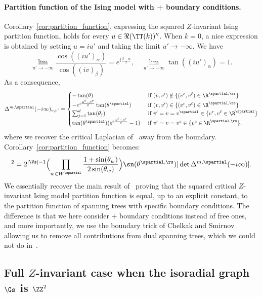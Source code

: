 \documentclass[a4paper,twoside,11pt]{article}
\begin{document}
\paragraph{Partition function of the Ising model with + boundary conditions.} Corollary~\ref{cor:partition_function}, 
expressing the squared $Z$-invariant
Ising partition function, holds for every $u\in\Re(\TT(k))''$. 
When $k=0$, a nice expression is obtained by setting $u=iu'$ and taking the limit $u'\rightarrow-\infty$. We have 
\[
\lim_{u'\rightarrow-\infty} \frac{\cos((iu')_\alpha)}{\cos((iv)_\beta)}=e^{i\frac{\beta-\alpha}{2}}, \quad 
\lim_{u'\rightarrow-\infty} \tan((iu')_{\alpha})=1.
\]
As a consequence, 
\begin{equation*}
\Delta^{m,\spartial}(-i\infty)_{v,v'}=
\begin{cases}
-\tan(\theta)& \text{  if $(v,v')\notin\{(v^c,v^\ell)\in \R^{\spartial,\rs}\}$}\\
-e^{i\frac{\alpha^\ell-\beta^r}{2}}\tan(\theta^\spartial)&\text{ if $(v,v')\in\{(v^c,v^\ell)\in \R^{\spartial,\rs}\}$}\\
\sum_{j=1}^d \tan(\theta_j)&\text{ if $v'=v=v^\spartial\in\{v^r,v^\ell\in\R^\spartial\}$}\\
\tan(\theta^\spartial)(e^{i\frac{\alpha^\ell-\beta^r}{2}}-1)&\text{ if $v'=v=v^c\in\{v^c\in \R^{\spartial,\rs}\}$},
\end{cases}
\end{equation*}
where we recover the critical Laplacian of~\cite{Kenyon3} away from the boundary. Corollary~\ref{cor:partition_function} becomes:
\begin{equation*}
[\Zising^+(\Gs,\Js)]^2=2^{|\Vs|-1}
\Bigl(\prod_{w\in W^\spartial}\frac{1+\sin(\theta_w)}{2\sin(\theta_w)}\Bigr)
\sn(\theta^{\spartial,\rs})|\det \Delta^{m,\spartial}(-i\infty)|.\\
\end{equation*}
We essentially recover the main result of~\cite{deTiliere:partition} proving that the squared critical $Z$-invariant Ising model partition function 
is equal, up to an explicit constant, to the partition function of spanning trees with specific boundary conditions. The difference is that we here consider + boundary conditions instead of free ones, and 
more importantly, we use the boundary trick of Chelkak and Smirnov~\cite{ChelkakSmirnov:ising} allowing us to remove all contributions from 
dual spanning trees, which we could not do in~\cite{deTiliere:partition}.



\subsection{Full $Z$-invariant case when the isoradial graph $\Gs$ is $\ZZ^2$}\label{sec:ex_Z_inv_ZZ2}
\end{document}
